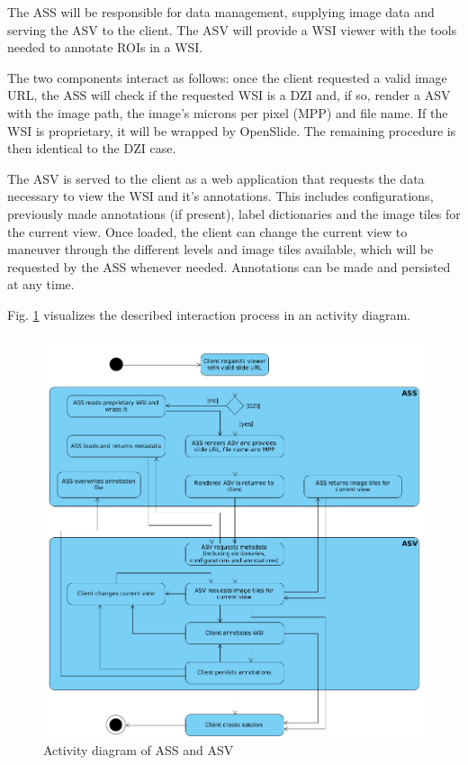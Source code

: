 The ASS will be responsible for data management, supplying image data and serving the ASV to the client. The ASV will provide a WSI viewer with the tools needed to annotate ROIs in a WSI.

The two components interact as follows: once the client requested a valid image URL, the ASS will check if the requested WSI is a DZI and, if so, render a ASV with the image path, the image's microns per pixel (MPP) and file name. If the WSI is proprietary, it will be wrapped by OpenSlide. The remaining procedure is then identical to the DZI case.

The ASV is served to the client as a web application that requests the data necessary to view the WSI and it's annotations. This includes configurations, previously made annotations (if present), label dictionaries and the image tiles for the current view. Once loaded, the client can change the current view to maneuver through the different levels and image tiles available, which will be requested by the ASS whenever needed. Annotations can be made and persisted at any time.

Fig. \ref{fig4_asUml} visualizes the described interaction process in an activity diagram.

\begin{figure}[!h]
	\begin{center}
		\includegraphics[scale=0.4]{img/asUML.png}
		\caption{Activity diagram of ASS and ASV}
		\label{fig4_asUml}
	\end{center}
\end{figure}


